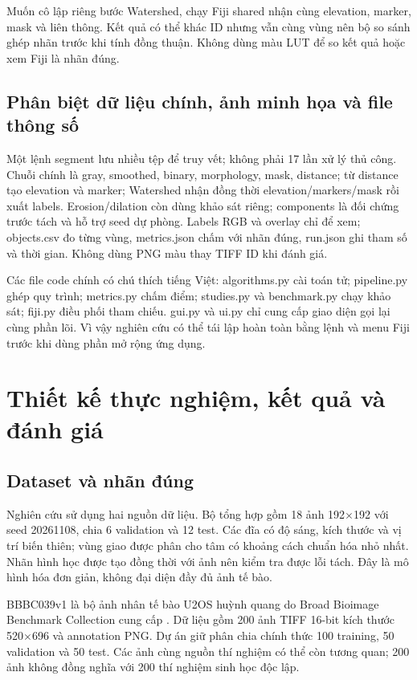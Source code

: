 \documentclass[12pt,a4paper,oneside]{report}
\begin{document}
Muốn cô lập riêng bước Watershed, chạy Fiji shared nhận cùng elevation, marker, mask và liên thông. Kết quả có thể khác ID nhưng vẫn cùng vùng nên bộ so sánh ghép nhãn trước khi tính đồng thuận. Không dùng màu LUT để so kết quả hoặc xem Fiji là nhãn đúng.

\section{Phân biệt dữ liệu chính, ảnh minh họa và file thông số}
Một lệnh segment lưu nhiều tệp để truy vết; không phải 17 lần xử lý thủ công. Chuỗi chính là gray, smoothed, binary, morphology, mask, distance; từ distance tạo elevation và marker; Watershed nhận đồng thời elevation/markers/mask rồi xuất labels. Erosion/dilation còn dùng khảo sát riêng; components là đối chứng trước tách và hỗ trợ seed dự phòng. Labels RGB và overlay chỉ để xem; objects.csv đo từng vùng, metrics.json chấm với nhãn đúng, run.json ghi tham số và thời gian. Không dùng PNG màu thay TIFF ID khi đánh giá.

Các file code chính có chú thích tiếng Việt: algorithms.py cài toán tử; pipeline.py ghép quy trình; metrics.py chấm điểm; studies.py và benchmark.py chạy khảo sát; fiji.py điều phối tham chiếu. gui.py và ui.py chỉ cung cấp giao diện gọi lại cùng phần lõi. Vì vậy nghiên cứu có thể tái lập hoàn toàn bằng lệnh và menu Fiji trước khi dùng phần mở rộng ứng dụng.
\chapter{Thiết kế thực nghiệm, kết quả và đánh giá}\label{chap:experiments}

\section{Dataset và nhãn đúng}
Nghiên cứu sử dụng hai nguồn dữ liệu. Bộ tổng hợp gồm 18 ảnh 192\ensuremath{\times}192 với seed 20261108, chia 6 validation và 12 test. Các đĩa có độ sáng, kích thước và vị trí biến thiên; vùng giao được phân cho tâm có khoảng cách chuẩn hóa nhỏ nhất. Nhãn hình học được tạo đồng thời với ảnh nên kiểm tra được lỗi tách. Đây là mô hình hóa đơn giản, không đại diện đầy đủ ảnh tế bào.

BBBC039v1 là bộ ảnh nhân tế bào U2OS huỳnh quang do Broad Bioimage Benchmark Collection cung cấp \cite{ref4}. Dữ liệu gồm 200 ảnh TIFF 16-bit kích thước 520\ensuremath{\times}696 và annotation PNG. Dự án giữ phân chia chính thức 100 training, 50 validation và 50 test. Các ảnh cùng nguồn thí nghiệm có thể còn tương quan; 200 ảnh không đồng nghĩa với 200 thí nghiệm sinh học độc lập.
\end{document}
